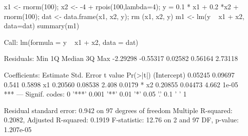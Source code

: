 \begin{Schunk}
\begin{Sinput}
 x1 <- rnorm(100); x2 <- -4 + rpois(100,lambda=4);
 y = 0.1 * x1 + 0.2 *x2 + rnorm(100);
 dat <- data.frame(x1, x2, y); rm (x1, x2, y)
 m1 <- lm(y ~ x1 + x2, data=dat)
 summary(m1)
\end{Sinput}
\begin{Soutput}
Call:
lm(formula = y ~ x1 + x2, data = dat)

Residuals:
     Min       1Q   Median       3Q      Max 
-2.29298 -0.55317  0.02582  0.56164  2.73118 

Coefficients:
            Estimate Std. Error t value Pr(>|t|)    
(Intercept)  0.05245    0.09697   0.541   0.5898    
x1           0.20560    0.08538   2.408   0.0179 *  
x2           0.20855    0.04473   4.662    1e-05 ***
---
Signif. codes:  0 '***' 0.001 '**' 0.01 '*' 0.05 '.' 0.1 ' ' 1

Residual standard error: 0.942 on 97 degrees of freedom
Multiple R-squared:  0.2082,	Adjusted R-squared:  0.1919 
F-statistic: 12.76 on 2 and 97 DF,  p-value: 1.207e-05
\end{Soutput}
\end{Schunk}
